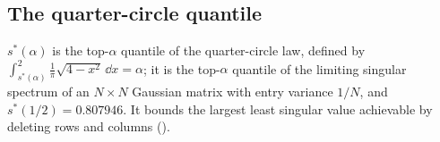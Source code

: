 \subsection{The quarter-circle quantile}
$s^*(\alpha)$ is the top-$\alpha$ quantile of the quarter-circle law, defined by
$\int_{s^*(\alpha)}^{2}\tfrac1\pi\sqrt{4-x^2}\,\dd x=\alpha$; it is the top-$\alpha$ quantile of the
limiting singular spectrum of an $N\times N$ Gaussian matrix with entry variance $1/N$, and
$s^*(1/2)=0.807946$. It bounds the largest least singular value achievable by deleting rows and
columns ().
